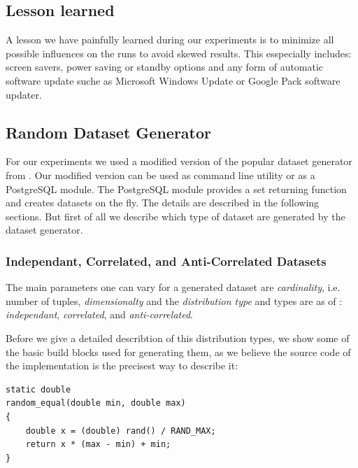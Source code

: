 \subsection{Lesson learned}
A lesson we have painfully learned during our experiments is to
minimize all possible influences on the runs to avoid skewed
results. This esspecially includes: screen savers, power saving or
standby options and any form of automatic software update suche as
Microsoft Windows Update or Google Pack software updater.

\subsection{Random Dataset Generator}

For our experiments we used a modified version \citep{Eder2007a} of
the popular dataset generator from \citep{Borzsonyi2001}.  Our
modified version can be used as command line utility or as a
PostgreSQL module. The PostgreSQL module provides a set returning
function and creates datasets on the fly.  The details are described
in the following sections.  But first of all we describe which type of
dataset are generated by the dataset generator.

\subsubsection{Independant, Correlated, and Anti-Correlated Datasets}
\label{sec:corr-anti-indep}

The main parameters one can vary for a generated dataset are
\emph{cardinality}, i.e. number of tuples, \emph{dimensionalty} and
the \emph{distribution type} and types are as of \citep{Borzsonyi2001}: 
\emph{independant}, \emph{correlated}, and \emph{anti-correlated}.


Before we give a detailed describtion of this distribution types, we
show some of the basic build blocks used for generating them, as we
believe the source code of the implementation is the precisest way to
describe it:

\begin{lstlisting}
static double
random_equal(double min, double max)
{
	double x = (double) rand() / RAND_MAX;
	return x * (max - min) + min;
}
\end{lstlisting}

